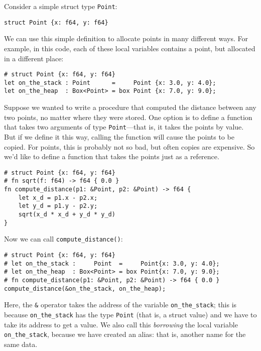 \documentclass[]{article}
\begin{document}
Consider a simple struct type \texttt{Point}:

\begin{verbatim}
struct Point {x: f64, y: f64}
\end{verbatim}

We can use this simple definition to allocate points in many different
ways. For example, in this code, each of these local variables contains
a point, but allocated in a different place:

\begin{verbatim}
# struct Point {x: f64, y: f64}
let on_the_stack : Point      =     Point {x: 3.0, y: 4.0};
let on_the_heap  : Box<Point> = box Point {x: 7.0, y: 9.0};
\end{verbatim}

Suppose we wanted to write a procedure that computed the distance
between any two points, no matter where they were stored. One option is
to define a function that takes two arguments of type
\texttt{Point}---that is, it takes the points by value. But if we define
it this way, calling the function will cause the points to be copied.
For points, this is probably not so bad, but often copies are expensive.
So we'd like to define a function that takes the points just as a
reference.

\begin{verbatim}
# struct Point {x: f64, y: f64}
# fn sqrt(f: f64) -> f64 { 0.0 }
fn compute_distance(p1: &Point, p2: &Point) -> f64 {
    let x_d = p1.x - p2.x;
    let y_d = p1.y - p2.y;
    sqrt(x_d * x_d + y_d * y_d)
}
\end{verbatim}

Now we can call \texttt{compute\_distance()}:

\begin{verbatim}
# struct Point {x: f64, y: f64}
# let on_the_stack :     Point  =     Point{x: 3.0, y: 4.0};
# let on_the_heap  : Box<Point> = box Point{x: 7.0, y: 9.0};
# fn compute_distance(p1: &Point, p2: &Point) -> f64 { 0.0 }
compute_distance(&on_the_stack, on_the_heap);
\end{verbatim}

Here, the \texttt{\&} operator takes the address of the variable
\texttt{on\_the\_stack}; this is because \texttt{on\_the\_stack} has the
type \texttt{Point} (that is, a struct value) and we have to take its
address to get a value. We also call this \emph{borrowing} the local
variable \texttt{on\_the\_stack}, because we have created an alias: that
is, another name for the same data.
\end{document}
